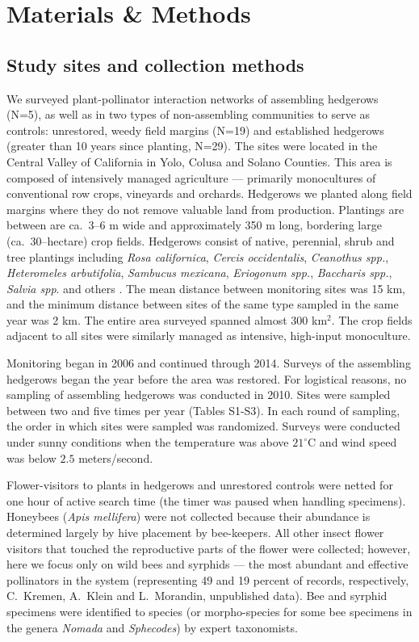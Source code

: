 \documentclass[12pt]{article}
\begin{document}
\section*{Materials \& Methods}
\label{sec:methods}

\subsection*{Study sites and collection methods}
\label{sec:study-sites}

We surveyed plant-pollinator interaction networks of assembling
hedgerows (N=5), as well as in two types of non-assembling communities
to serve as controls: unrestored, weedy field margins (N=19) and
established hedgerows (greater than 10 years since planting,
N=29). The sites were located in the Central Valley of California in
Yolo, Colusa and Solano Counties. This area is composed of intensively
managed agriculture --- primarily monocultures of conventional row
crops, vineyards and orchards. Hedgerows we planted along field
margins where they do not remove valuable land from
production. Plantings are between are ca.~3--6 m wide and
approximately 350 m long, bordering large (ca.\ 30--hectare) crop
fields. Hedgerows consist of native, perennial, shrub and tree
plantings including \textit{Rosa californica}, \textit{Cercis
  occidentalis}, \textit{Ceanothus spp.}, \textit{Heteromeles
  arbutifolia}, \textit{Sambucus mexicana}, \textit{Eriogonum spp.},
\textit{Baccharis spp.}, \textit{Salvia spp}. and others
\citep{kremen-2015-602, mgonigle-2015-x}. The mean distance between
monitoring sites was 15 km, and the minimum distance between sites of
the same type sampled in the same year was 2 km.  The entire area
surveyed spanned almost 300 km$^2$. The crop fields adjacent to all
sites were similarly managed as intensive, high-input monoculture.

Monitoring began in 2006 and continued through 2014. Surveys of the
assembling hedgerows began the year before the area was restored. For
logistical reasons, no sampling of assembling hedgerows was conducted
in 2010. Sites were sampled between two and five times per year
(Tables S1-S3). In each round of sampling, the order in which sites
were sampled was randomized. Surveys were conducted under sunny
conditions when the temperature was above $21^{\circ}\mathrm{C}$ and
wind speed was below $2.5$ meters/second.

Flower-visitors to plants in hedgerows and unrestored controls were
netted for one hour of active search time (the timer was paused when
handling specimens). Honeybees (\textit{Apis mellifera}) were not
collected because their abundance is determined largely by hive
placement by bee-keepers. All other insect flower visitors that
touched the reproductive parts of the flower were collected; however,
here we focus only on wild bees and syrphids --- the most abundant and
effective pollinators in the system (representing 49 and 19 percent of
records, respectively, C.~Kremen, A.~Klein and L.~Morandin,
unpublished data). Bee and syrphid specimens were identified to
species (or morpho-species for some bee specimens in the genera
\textit{Nomada} and \textit{Sphecodes}) by expert taxonomists.
\end{document}
